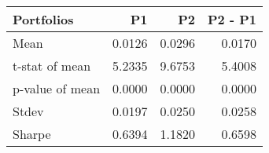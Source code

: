 \begin{tabular}{lrrr}
\toprule
Portfolios & P1 & P2 & P2 - P1 \\
\midrule
Mean & 0.0126 & 0.0296 & 0.0170 \\
t-stat of mean & 5.2335 & 9.6753 & 5.4008 \\
p-value of mean & 0.0000 & 0.0000 & 0.0000 \\
Stdev & 0.0197 & 0.0250 & 0.0258 \\
Sharpe & 0.6394 & 1.1820 & 0.6598 \\
\bottomrule
\end{tabular}
